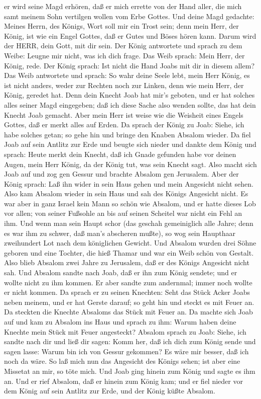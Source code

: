 er wird seine Magd erhören, daß er mich errette von der Hand aller, die
mich samt meinem Sohn vertilgen wollen vom Erbe Gottes. 
Und deine Magd gedachte: Meines Herrn, des Königs, Wort soll mir ein
Trost sein; denn mein Herr, der König, ist wie ein Engel Gottes, daß er
Gutes und Böses hören kann. Darum wird der HERR, dein Gott, mit dir
sein.  Der König antwortete und sprach zu dem Weibe: Leugne
mir nicht, was ich dich frage. Das Weib sprach: Mein Herr, der König,
rede.  Der König sprach: Ist nicht die Hand Joabs mit dir
in diesem allem? Das Weib antwortete und sprach: So wahr deine Seele
lebt, mein Herr König, es ist nicht anders, weder zur Rechten noch zur
Linken, denn wie mein Herr, der König, geredet hat. Denn dein Knecht
Joab hat mir's geboten, und er hat solches alles seiner Magd eingegeben;
 daß ich diese Sache also wenden sollte, das hat dein
Knecht Joab gemacht. Aber mein Herr ist weise wie die Weisheit eines
Engels Gottes, daß er merkt alles auf Erden.  Da sprach der
König zu Joab: Siehe, ich habe solches getan; so gehe hin und bringe den
Knaben Absalom wieder.  Da fiel Joab auf sein Antlitz zur
Erde und beugte sich nieder und dankte dem König und sprach: Heute merkt
dein Knecht, daß ich Gnade gefunden habe vor deinen Augen, mein Herr
König, da der König tut, was sein Knecht sagt.  Also macht
sich Joab auf und zog gen Gessur und brachte Absalom gen Jerusalem.
 Aber der König sprach: Laß ihn wider in sein Haus gehen
und mein Angesicht nicht sehen. Also kam Absalom wieder in sein Haus und
sah des Königs Angesicht nicht.  Es war aber in ganz Israel
kein Mann so schön wie Absalom, und er hatte dieses Lob vor allen; von
seiner Fußsohle an bis auf seinen Scheitel war nicht ein Fehl an ihm.
 Und wenn man sein Haupt schor (das geschah gemeiniglich
alle Jahre; denn es war ihm zu schwer, daß man's abscheren mußte), so
wog sein Haupthaar zweihundert Lot nach dem königlichen Gewicht.
 Und Absalom wurden drei Söhne geboren und eine Tochter,
die hieß Thamar und war ein Weib schön von Gestalt.  Also
blieb Absalom zwei Jahre zu Jerusalem, daß er des Königs Angesicht nicht
sah.  Und Absalom sandte nach Joab, daß er ihn zum König
sendete; und er wollte nicht zu ihm kommen. Er aber sandte zum
andernmal; immer noch wollte er nicht kommen.  Da sprach er
zu seinen Knechten: Seht das Stück Acker Joabs neben meinem, und er hat
Gerste darauf; so geht hin und steckt es mit Feuer an. Da steckten die
Knechte Absaloms das Stück mit Feuer an.  Da machte sich
Joab auf und kam zu Absalom ins Haus und sprach zu ihm: Warum haben
deine Knechte mein Stück mit Feuer angesteckt?  Absalom
sprach zu Joab: Siehe, ich sandte nach dir und ließ dir sagen: Komm her,
daß ich dich zum König sende und sagen lasse: Warum bin ich von Gessur
gekommen? Es wäre mir besser, daß ich noch da wäre. So laß mich nun das
Angesicht des Königs sehen; ist aber eine Missetat an mir, so töte mich.
 Und Joab ging hinein zum König und sagte es ihm an. Und er
rief Absalom, daß er hinein zum König kam; und er fiel nieder vor dem
König auf sein Antlitz zur Erde, und der König küßte Absalom.

